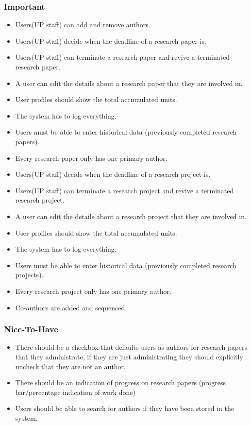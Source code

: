 \documentclass[a4paper,12pt]{report}
\begin{document}
\subsubsection{Important}
	\begin{itemize}
		\item Users(UP staff) can add and remove authors.
		\item Users(UP staff) decide when the deadline of a research paper is.
		\item Users(UP staff) can terminate a research paper and revive a terminated research paper.
		\item A user can edit the details about a research paper that they are involved in.
		\item User profiles should show the total accumulated units.
		\item The system has to log everything.
		\item Users must be able to enter historical data (previously completed research papers).
		\item Every research paper only has one primary author.
		\item Users(UP staff) decide when the deadline of a research project is.
		\item Users(UP staff) can terminate a research project and revive a terminated research project.
		\item A user can edit the details about a research project that they are involved in.
		\item User profiles should show the total accumulated units.
		\item The system has to log everything.
		\item Users must be able to enter historical data (previously completed research projects).
		\item Every research project only has one primary author.
		\item Co-authors are added and sequenced.
	\end{itemize}

\subsubsection{Nice-To-Have}
\begin{itemize}
	\item There should be a checkbox that defaults users as authors for research papers that they administrate, if they are just administrating they should explicitly uncheck that they are not an author.
	\item There should be an indication of progress on research papers (progress bar/percentage indication of work done)
	\item Users should be able to search for authors if they have been stored in the system.
\end{itemize}
\end{document}
